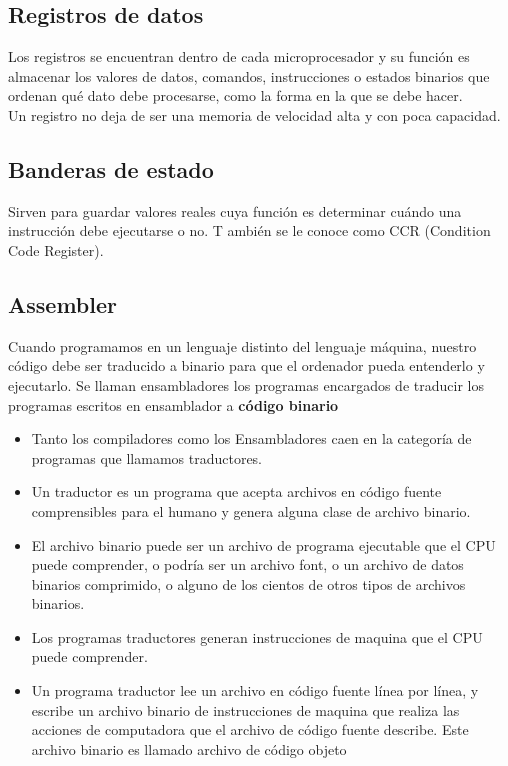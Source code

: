 \documentclass[conference]{IEEEtran}
\begin{document}
\subsection{Registros de datos}
Los registros se encuentran dentro de cada microprocesador y su función es almacenar los valores de datos, 
comandos, instrucciones o estados binarios que ordenan qué dato debe procesarse, como la forma en la 
que se debe hacer. \\
Un registro no deja de ser una memoria de velocidad alta y con poca capacidad.

\subsection{Banderas de estado}
Sirven para guardar valores reales cuya función es determinar cuándo una instrucción debe ejecutarse o no. T
ambién se le conoce como CCR (Condition Code Register). 

\subsection{Assembler}
Cuando programamos en un lenguaje distinto del lenguaje máquina, nuestro código debe ser
traducido a binario para que el ordenador pueda entenderlo y ejecutarlo. 
Se llaman ensambladores los programas encargados de traducir los programas escritos en
ensamblador a \textbf{código binario}

\begin{itemize}
    \item Tanto los compiladores como los Ensambladores caen en la categoría de
    programas que llamamos traductores.
    \item Un traductor es un programa que acepta archivos en código fuente
    comprensibles para el humano y genera alguna clase de archivo binario.
    \item El archivo binario puede ser un archivo de programa ejecutable que el CPU
    puede comprender, o podría ser un archivo font, o un archivo de datos binarios
    comprimido, o alguno de los cientos de otros tipos de archivos binarios.
    \item Los programas traductores generan instrucciones de maquina que el CPU
    puede comprender.
    \item Un programa traductor lee un archivo en código fuente línea por línea, y
    escribe un archivo binario de instrucciones de maquina que realiza las
    acciones de computadora que el archivo de código fuente describe. Este
    archivo binario es llamado archivo de código objeto
\end{itemize}
\end{document}
